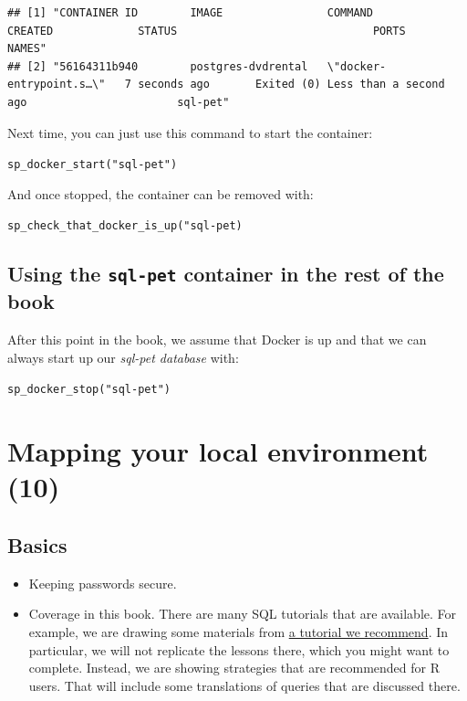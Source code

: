 \documentclass[]{book}
\providecommand{\tightlist}{%
  \setlength{\itemsep}{0pt}\setlength{\parskip}{0pt}}
\theoremstyle{definition}
\theoremstyle{definition}
\theoremstyle{definition}
\theoremstyle{remark}
\begin{document}
\begin{verbatim}
## [1] "CONTAINER ID        IMAGE                COMMAND                  CREATED             STATUS                              PORTS               NAMES"    
## [2] "56164311b940        postgres-dvdrental   \"docker-entrypoint.s…\"   7 seconds ago       Exited (0) Less than a second ago                       sql-pet"
\end{verbatim}

Next time, you can just use this command to start the container:

\texttt{sp\_docker\_start("sql-pet")}

And once stopped, the container can be removed with:

\texttt{sp\_check\_that\_docker\_is\_up("sql-pet)}

\hypertarget{using-the-sql-pet-container-in-the-rest-of-the-book}{%
\section{\texorpdfstring{Using the \texttt{sql-pet} container in the
rest of the
book}{Using the sql-pet container in the rest of the book}}\label{using-the-sql-pet-container-in-the-rest-of-the-book}}

After this point in the book, we assume that Docker is up and that we
can always start up our \emph{sql-pet database} with:

\texttt{sp\_docker\_stop("sql-pet")}

\hypertarget{mapping-your-local-environment-10}{%
\chapter{Mapping your local environment
(10)}\label{mapping-your-local-environment-10}}

\hypertarget{basics}{%
\section{Basics}\label{basics}}

\begin{itemize}
\tightlist
\item
  Keeping passwords secure.
\item
  Coverage in this book. There are many SQL tutorials that are
  available. For example, we are drawing some materials from
  \href{http://www.postgresqltutorial.com/postgresql-sample-database/}{a
  tutorial we recommend}. In particular, we will not replicate the
  lessons there, which you might want to complete. Instead, we are
  showing strategies that are recommended for R users. That will include
  some translations of queries that are discussed there.
\end{itemize}
\end{document}
